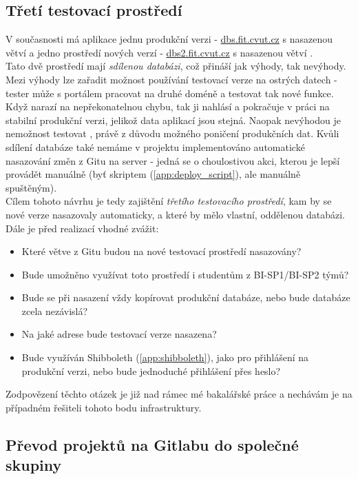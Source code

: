 \subsection{Třetí testovací prostředí}

V současnosti má aplikace jednu produkční verzi - \url{dbs.fit.cvut.cz} s nasazenou větví  a jedno  prostředí nových verzí - \url{dbs2.fit.cvut.cz} s nasazenou větví .\\
Tato dvě prostředí mají \emph{sdílenou databázi}, což přináší jak výhody, tak nevýhody. Mezi výhody lze zařadit možnost používání testovací verze na ostrých datech - tester může s portálem pracovat na druhé doméně a testovat tak nové funkce. Když narazí na nepřekonatelnou chybu, tak ji nahlásí a pokračuje v práci na stabilní produkční verzi, jelikož data aplikací jsou stejná. Naopak nevýhodou je nemožnost testovat , právě z důvodu možného poničení produkčních dat. Kvůli sdílení databáze také nemáme v projektu implementováno automatické nasazování změn z Gitu na server - jedná se o choulostivou akci, kterou je lepší provádět manuálně (byť skriptem (\ref{app:deploy_script}), ale manuálně spuštěným).\\
Cílem tohoto návrhu je tedy zajištění \emph{třetího testovacího prostředí}, kam by se nové verze nasazovaly automaticky, a které by mělo vlastní, oddělenou databázi. Dále je před realizací vhodné zvážit:
\begin{itemize}
	\item Které větve z Gitu budou na nové testovací prostředí nasazovány?
	\item Bude umožněno využívat toto prostředí i studentům z BI-SP1/BI-SP2 týmů?
	\item Bude se při nasazení vždy kopírovat produkční databáze, nebo bude databáze zcela nezávislá?
	\item Na jaké adrese bude testovací verze nasazena?
	\item Bude využíván Shibboleth (\ref{app:shibboleth}), jako pro přihlášení na produkční verzi, nebo bude jednoduché přihlášení přes heslo?
\end{itemize}
Zodpovězení těchto otázek je již nad rámec mé bakalářské práce a nechávám je na případném řešiteli tohoto bodu infrastruktury.

\subsection{Převod projektů na Gitlabu do společné skupiny}

